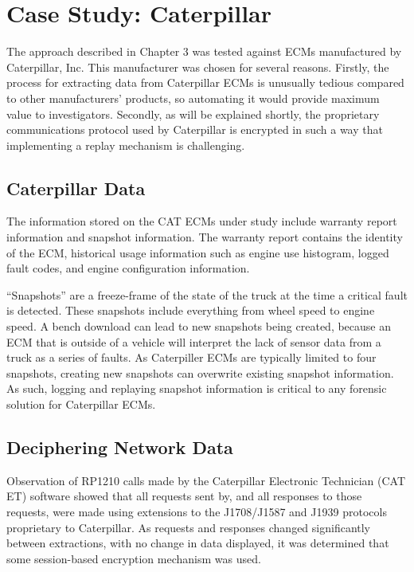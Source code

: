 \chapter{Case Study: Caterpillar}

The approach described in Chapter 3 was tested against ECMs manufactured by Caterpillar, Inc. This manufacturer was
chosen for several reasons. Firstly, the process for extracting data from Caterpillar ECMs is unusually tedious compared
to other manufacturers' products, so automating it would provide maximum value to investigators.
Secondly, as will be explained shortly, the proprietary communications protocol used
by Caterpillar is encrypted in such a way that implementing a replay mechanism is challenging.

\section{Caterpillar Data}

The information stored on the CAT ECMs under study include warranty report information and snapshot
information. The warranty report contains the identity of the ECM, historical usage information such as engine use histogram,
logged fault codes, and engine configuration information.

``Snapshots'' are a freeze-frame of the state of the truck at the time a critical fault is detected. These snapshots
include everything from wheel speed to engine speed. A bench download can lead to new snapshots being created, because an ECM that is outside
of a vehicle will interpret the lack of sensor data from a truck as a series of faults. As Caterpiller ECMs are typically
limited to four snapshots, creating new snapshots can overwrite existing snapshot information. As such, logging and replaying snapshot information is critical to any forensic solution for
Caterpillar ECMs.

\section{Deciphering Network Data}

Observation of RP1210 calls made by the Caterpillar Electronic Technician (CAT ET) software showed that all requests sent by,
and all responses to those requests, were made using extensions to the J1708/J1587 and J1939 protocols
proprietary to Caterpillar. As requests and responses changed significantly between extractions, with
no change in data displayed, it was determined that some session-based encryption mechanism was
used.

